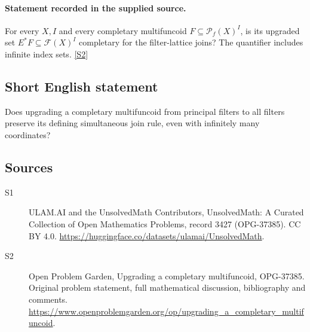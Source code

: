 \documentclass[11pt]{article}
\newcommand{\sref}[2]{\hyperlink{source:#1:#2}{[S#2]}}
\begin{document}
\paragraph{Statement recorded in the supplied source.}
For every $X,I$ and every completary multifuncoid $F\subseteq\mathcal P_f(X)^I$, is its upgraded set $E^*F\subseteq\mathcal F(X)^I$ completary for the filter-lattice joins? The quantifier includes infinite index sets. \sref{3427}{2}
\subsection{Short English statement}
Does upgrading a completary multifuncoid from principal filters to all filters preserve its defining simultaneous join rule, even with infinitely many coordinates?
\subsection{Sources}
\begin{description}
\item[\hypertarget{source:3427:1}{S1}] ULAM.AI and the UnsolvedMath Contributors, UnsolvedMath: A Curated Collection of Open Mathematics Problems, record 3427 (OPG-37385). CC BY 4.0. \url{https://huggingface.co/datasets/ulamai/UnsolvedMath}.
\item[\hypertarget{source:3427:2}{S2}] Open Problem Garden, Upgrading a completary multifuncoid, OPG-37385. Original problem statement, full mathematical discussion, bibliography and comments. \url{https://www.openproblemgarden.org/op/upgrading_a_completary_multifuncoid}.
\end{description}
\label{end:3427}
\end{document}
